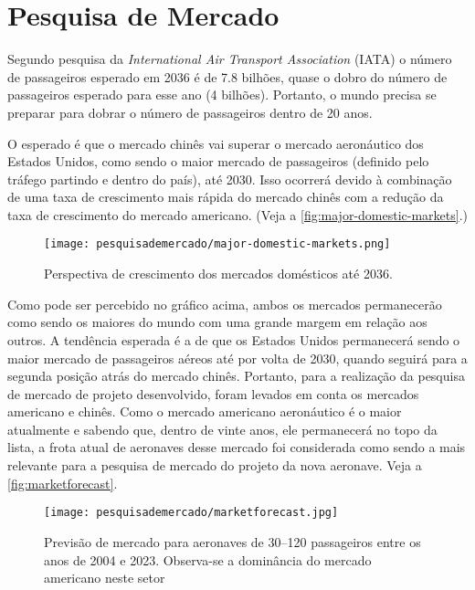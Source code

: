 \chapter{Pesquisa de Mercado}
\label{mercado}
Segundo pesquisa da \emph{International Air Transport Association} (IATA) o número de passageiros esperado em 2036 é de 7.8 bilhões, quase o dobro do número de passageiros esperado para esse ano (4 bilhões).
Portanto, o mundo precisa se preparar para dobrar o número de passageiros dentro de 20 anos. \cite{iata}

O esperado é que o mercado chinês vai superar o mercado aeronáutico dos Estados Unidos, como sendo o maior mercado de passageiros (definido pelo tráfego partindo e dentro do país), até 2030.
Isso ocorrerá devido à combinação de uma taxa de crescimento mais rápida do mercado chinês com a redução da taxa de crescimento do mercado americano. (Veja a \autoref{fig:major-domestic-markets}.) \cite{iata}

\begin{figure}[H]
\centering
\texttt{[image: pesquisademercado/major-domestic-markets.png]}
\caption[Perspectiva de crescimento dos mercados domésticos até 2036]{Perspectiva de crescimento dos mercados domésticos até 2036\cite{iata}.}
\label{fig:major-domestic-markets}
\end{figure}

Como pode ser percebido no gráfico acima, ambos os mercados permanecerão como sendo os maiores do mundo com uma grande margem em relação aos outros.
A tendência esperada é a de que os Estados Unidos permanecerá sendo o maior mercado de passageiros aéreos até por volta de 2030, quando seguirá para a segunda posição atrás do mercado chinês.
Portanto, para a realização da pesquisa de mercado de projeto desenvolvido, foram levados em conta os mercados americano e chinês. 
Como o mercado americano aeronáutico é o maior atualmente e sabendo que, dentro de vinte anos, ele permanecerá no topo da lista, a frota atual de aeronaves desse mercado foi considerada como sendo a mais relevante para a pesquisa de mercado do projeto da nova aeronave.
Veja a \autoref{fig:marketforecast}.

\begin{figure}[H]
\centering
\texttt{[image: pesquisademercado/marketforecast.jpg]}
\caption[Previsão de mercado para 2004--2023]{Previsão de mercado para aeronaves de 30--120 passageiros entre os anos de 2004 e 2023. Observa-se a dominância do mercado americano neste setor}
\label{fig:marketforecast}
\end{figure}

